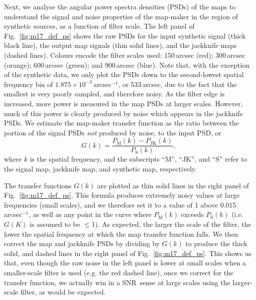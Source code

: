 \documentclass[useAMS,usenatbib,nofootinbib]{mn2e}
\newcommand{\snr}{SNR}
\begin{document}
Next, we analyse the angular power spectra densities (PSDs) of the
maps to understand the signal and noise properties of the map-maker in
the region of synthetic sources, as a function of filter scale. The
left panel of Fig.~\ref{fig:m17_def_ps} shows the raw PSDs for the
input synthetic signal (thick black line), the output map signals
(thin solid lines), and the jackknife maps (dashed lines). Colours
encode the filter scales used: 150\,arcsec (red); 300\,arcsec
(orange); 600\,arcsec (green); and 900\,arcsec (blue). Note that, with
the exception of the synthetic data, we only plot the PSDs down to the
second-lowest spatial frequency bin of
$1.875\times10^{-3}$\,arcsec$^{-1}$, or 533\,arcsec, due to the fact
that the smallest is very poorly sampled, and therefore noisy. As the
filter edge is increased, more power is measured in the map PSDs at
larger scales. However, much of this power is clearly produced by
noise which appears in the jackknife PSDs. We estimate the map-maker
transfer function as the ratio between the portion of the signal PSDs
\emph{not} produced by noise, to the input PSD, or
%
\begin{equation}
G(k) = \frac{P_\mathrm{M}(k) - P_\mathrm{JK}(k)}{P_\mathrm{S}(k)},
\end{equation}
%
where $k$ is the spatial frequency, and the subscripts ``M'', ``JK'',
and ``S'' refer to the signal map, jackknife map, and synthetic map,
respectively.

The transfer functions $G(k)$ are plotted as thin solid lines in the
right panel of Fig.~\ref{fig:m17_def_ps}. This formula produces
extremely noisy values at large frequencies (small scales), and we
therefore set it to a value of 1 above 0.015\,arcsec$^{-1}$, as well
as any point in the curve where $P_\mathrm{M}(k)$ exceeds
$P_\mathrm{S}(k)$ (i.e. $G(K)$ is assumed to be $\le$1). As expected,
the larger the scale of the filter, the lower the spatial frequency at
which the map transfer function falls. We then correct the map and
jackknife PSDs by dividing by $G(k)$ to produce the thick solid, and
dashed lines in the right panel of Fig.~\ref{fig:m17_def_ps}. This
shows us that, even though the raw noise in the left panel is lower at
small scales when a smaller-scale filter is used (e.g. the red dashed
line), once we correct for the transfer function, we actually win in a
\snr\ sense at large scales using the larger-scale filter, as would be
expected.
\end{document}
